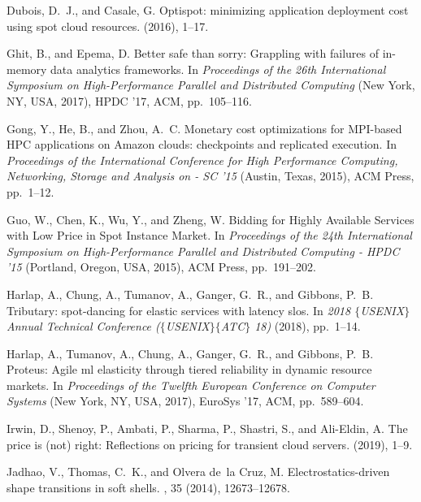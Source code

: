 \documentclass[sigconf]{acmart} %
\begin{document}
\begin{thebibliography}{10}
{\sc Dubois, D.~J., and Casale, G.}
\newblock Optispot: minimizing application deployment cost using spot cloud
  resources.
 (2016), 1--17.

{\sc Ghit, B., and Epema, D.}
\newblock Better safe than sorry: Grappling with failures of in-memory data
  analytics frameworks.
\newblock In {\em Proceedings of the 26th International Symposium on
  High-Performance Parallel and Distributed Computing\/} (New York, NY, USA,
  2017), HPDC '17, ACM, pp.~105--116.

{\sc Gong, Y., He, B., and Zhou, A.~C.}
\newblock Monetary cost optimizations for {MPI}-based {HPC} applications on
  {Amazon} clouds: checkpoints and replicated execution.
\newblock In {\em Proceedings of the {International} {Conference} for {High}
  {Performance} {Computing}, {Networking}, {Storage} and {Analysis} on - {SC}
  '15\/} (Austin, Texas, 2015), ACM Press, pp.~1--12.

{\sc Guo, W., Chen, K., Wu, Y., and Zheng, W.}
\newblock Bidding for {Highly} {Available} {Services} with {Low} {Price} in
  {Spot} {Instance} {Market}.
\newblock In {\em Proceedings of the 24th {International} {Symposium} on
  {High}-{Performance} {Parallel} and {Distributed} {Computing} - {HPDC} '15\/}
  (Portland, Oregon, USA, 2015), ACM Press, pp.~191--202.

{\sc Harlap, A., Chung, A., Tumanov, A., Ganger, G.~R., and Gibbons, P.~B.}
\newblock Tributary: spot-dancing for elastic services with latency slos.
\newblock In {\em 2018 $\{$USENIX$\}$ Annual Technical Conference
  ($\{$USENIX$\}$$\{$ATC$\}$ 18)\/} (2018), pp.~1--14.

{\sc Harlap, A., Tumanov, A., Chung, A., Ganger, G.~R., and Gibbons, P.~B.}
\newblock Proteus: Agile ml elasticity through tiered reliability in dynamic
  resource markets.
\newblock In {\em Proceedings of the Twelfth European Conference on Computer
  Systems\/} (New York, NY, USA, 2017), EuroSys '17, ACM, pp.~589--604.

{\sc Irwin, D., Shenoy, P., Ambati, P., Sharma, P., Shastri, S., and Ali-Eldin,
  A.}
\newblock The price is (not) right: Reflections on pricing for transient cloud
  servers.
 (2019), 1--9.

{\sc Jadhao, V., Thomas, C.~K., and Olvera de~la Cruz, M.}
\newblock Electrostatics-driven shape transitions in soft shells.
, 35 (2014),
  12673--12678.


\end{thebibliography}
\end{document}
